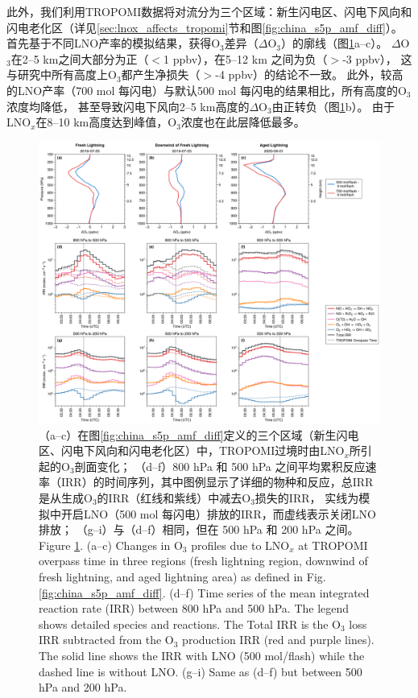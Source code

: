 此外，我们利用TROPOMI数据将对流分为三个区域：新生闪电区、闪电下风向和闪电老化区（详见\ref{sec:lnox_affects_tropomi}节和图\ref{fig:china_s5p_amf_diff}）。
首先基于不同LNO产率的模拟结果，获得O$_3$差异（$\Delta$O$_3$）的廓线（图\ref{fig:irr_timeseries}a--c）。
$\Delta$O$_3$在2--5 km之间大部分为正（$<$1 ppbv），在5--12 km 之间为负（$>$-3 ppbv），
这与\citet{Ott.2007}研究中所有高度上O$_3$都产生净损失（$>$-4 ppbv）的结论不一致。
此外，较高的LNO产率（700 mol 每闪电）与默认500 mol 每闪电的结果相比，所有高度的O$_3$浓度均降低，
甚至导致闪电下风向2--5 km高度的$\Delta$O$_3$由正转负（图\ref{fig:irr_timeseries}b）。
由于LNO$_x$在8--10 km高度达到峰值，O$_3$浓度也在此层降低最多。%

\begin{figure}[H]
\centering
\includegraphics[width=\textwidth]{./figures/irr_timeseries.png}
\caption{
（a--c）在图\ref{fig:china_s5p_amf_diff}定义的三个区域（新生闪电区、闪电下风向和闪电老化区）中，TROPOMI过境时由LNO$_x$所引起的O$_3$剖面变化；
（d--f）800 hPa 和 500 hPa 之间平均累积反应速率（IRR）的时间序列，其中图例显示了详细的物种和反应，总IRR是从生成O$_3$的IRR（红线和紫线）中减去O$_3$损失的IRR，
 实线为模拟中开启LNO（500 mol 每闪电）排放的IRR，而虚线表示关闭LNO排放；
（g--i）与（d--f）相同，但在 500 hPa 和 200 hPa 之间。\\
Figure \ref{fig:irr_timeseries}. (a--c) Changes in O$_3$ profiles due to LNO$_x$ at TROPOMI overpass time in three regions (fresh lightning region, downwind of fresh lightning, and aged lightning area) as defined in Fig. \ref{fig:china_s5p_amf_diff}.
(d--f) Time series of the mean integrated reaction rate (IRR) between 800 hPa and 500 hPa.
The legend shows detailed species and reactions.
The Total IRR is the O$_3$ loss IRR subtracted from the O$_3$ production IRR (red and purple lines).
The solid line shows the IRR with LNO (500 mol/flash) while the dashed line is without LNO.
(g--i) Same as (d--f) but between 500 hPa and 200 hPa.
}
\label{fig:irr_timeseries}
\end{figure}

